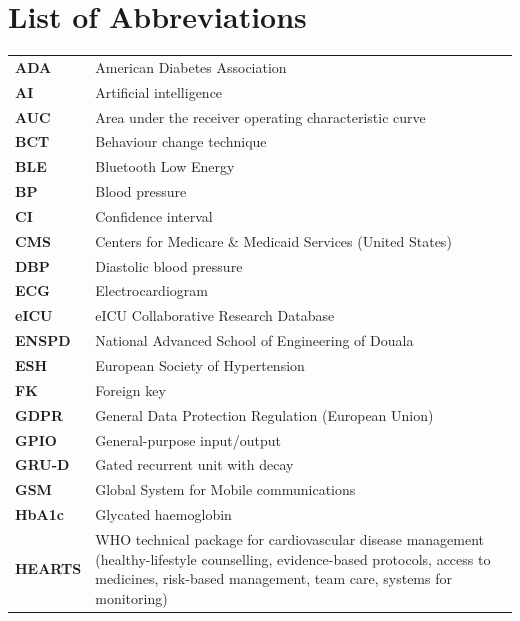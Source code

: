 \cleardoublepage{}
{}
\listoffigures

\cleardoublepage{}
{}
\listoftables

\cleardoublepage{}
\chapter*{List of Abbreviations}\label{app:abbreviations}

{\small
\begin{longtable}{@{}>{\bfseries}p{3.0cm} p{11.6cm}@{}}
ADA & American Diabetes Association \\
AI & Artificial intelligence \\
AUC & Area under the receiver operating characteristic curve \\
BCT & Behaviour change technique \\
BLE & Bluetooth Low Energy \\
BP & Blood pressure \\
CI & Confidence interval \\
CMS & Centers for Medicare \& Medicaid Services (United States) \\
DBP & Diastolic blood pressure \\
ECG & Electrocardiogram \\
eICU & eICU Collaborative Research Database \\
ENSPD & National Advanced School of Engineering of Douala \\
ESH & European Society of Hypertension \\
FK & Foreign key \\
GDPR & General Data Protection Regulation (European Union) \\
GPIO & General-purpose input/output \\
GRU-D & Gated recurrent unit with decay \\
GSM & Global System for Mobile communications \\
HbA1c & Glycated haemoglobin \\
HEARTS & WHO technical package for cardiovascular disease management (healthy-lifestyle counselling, evidence-based protocols, access to medicines, risk-based management, team care, systems for monitoring) \\

\end{longtable}}

